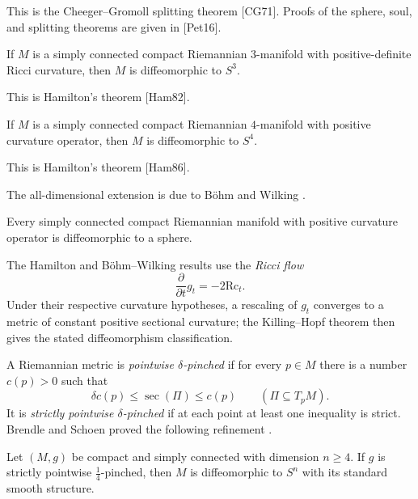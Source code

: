 This is the Cheeger--Gromoll splitting theorem [CG71]. Proofs of the sphere,
soul, and splitting theorems are given in [Pet16].

\begin{theorem}
\label{thm:hamilton-3-manifold}

If $M$ is a simply connected compact Riemannian $3$-manifold with
positive-definite Ricci curvature, then $M$ is diffeomorphic to $S^3$.
\end{theorem}

This is Hamilton's theorem [Ham82].

\begin{theorem}
\label{thm:hamilton-4-manifold}


If $M$ is a simply connected compact Riemannian $4$-manifold with positive
curvature operator, then $M$ is diffeomorphic to $S^4$.
\end{theorem}

This is Hamilton's theorem [Ham86].

The all-dimensional extension is due to Böhm and Wilking \cite{BW08}.

\begin{theorem}
\label{thm:bohm-wilking}


Every simply connected compact Riemannian manifold with positive curvature
operator is diffeomorphic to a sphere.
\end{theorem}

The Hamilton and Böhm--Wilking results use the \emph{Ricci flow}
\[
\frac{\partial}{\partial t}g_t=-2\mathrm{Rc}_t.
\]
Under their respective curvature hypotheses, a rescaling of $g_t$ converges
to a metric of constant positive sectional curvature; the Killing--Hopf
theorem then gives the stated diffeomorphism classification.

A Riemannian metric is \emph{pointwise $\delta$-pinched} if for every
$p\in M$ there is a number $c(p)>0$ such that
\[
\delta c(p)\leq\sec(\Pi)\leq c(p)
\qquad(\Pi\subseteq T_pM).
\]
It is \emph{strictly pointwise $\delta$-pinched} if at each point at least
one inequality is strict. Brendle and Schoen proved the following refinement
\cite{BS09}.

\begin{theorem}
\label{thm:differentiable-sphere-theorem}

Let $(M,g)$ be compact and simply connected with dimension $n\geq4$. If $g$
is strictly pointwise $\frac14$-pinched, then $M$ is diffeomorphic to $S^n$
with its standard smooth structure.
\end{theorem}

